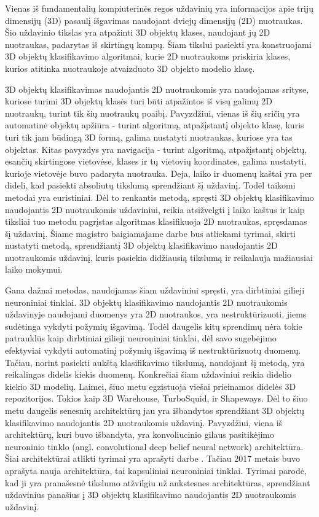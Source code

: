 
Vienas iš fundamentalių kompiuterinės regos uždavinių yra informacijos apie trijų dimensijų (3D) pasaulį išgavimas naudojant dviejų dimensijų (2D) nuotraukas. Šio uždavinio tikslas yra atpažinti 3D objektų klases, naudojant jų 2D nuotraukas, padarytas iš skirtingų kampų. Šiam tikslui pasiekti yra konstruojami 3D objektų klasifikavimo algoritmai, kurie 2D nuotraukoms priskiria klases, kurios atitinka nuotraukoje atvaizduoto 3D objekto modelio klasę.

3D objektų klasifikavimas naudojantis 2D nuotraukomis yra naudojamas srityse, kuriose turimi 3D objektų klasės turi būti atpažintos iš visų galimų 2D nuotraukų, turint tik šių nuotraukų poaibį. Pavyzdžiui, vienas iš šių sričių yra automatinė objektų apžiūra - turint algoritmą, atpažįstantį objekto klasę, kuris turi tik jam būdingą 3D formą, galima nustatyti nuotraukas, kuriose yra tas objektas. Kitas pavyzdys yra navigacija - turint algoritmą, atpažįstantį objektų, esančių skirtingose vietovėse, klases ir tų vietovių koordinates, galima nustatyti, kurioje vietovėje buvo padaryta nuotrauka. Deja, laiko ir duomenų kaštai yra per dideli, kad pasiekti absoliutų tikslumą sprendžiant šį uždavinį. Todėl taikomi metodai yra euristiniai. Dėl to renkantis metodą, spręsti 3D objektų klasifikavimo naudojantis 2D nuotraukomis uždaviniui, reikia atsižvelgti į laiko kaštus ir kaip tiksliai tuo metodu pagrįstas algoritmas klasifikuoja 2D nuotraukas, spręsdamas šį uždavinį. Šiame magistro baigiamajame darbe bus atliekami tyrimai, skirti nustatyti metodą, sprendžiantį 3D objektų klasifikavimo naudojantis 2D nuotraukomis uždavinį, kuris pasiekia didžiausią tikslumą ir reikalauja mažiausiai laiko mokymui.

Gana dažnai metodas, naudojamas šiam uždaviniui spręsti, yra dirbtiniai gilieji neuroniniai tinklai. 3D objektų klasifikavimo naudojantis 2D nuotraukomis uždavinyje naudojami duomenys yra 2D nuotraukos, yra nestruktūrizuoti, jiems sudėtinga vykdyti požymių išgavimą. Todėl daugelis kitų sprendimų nėra tokie patrauklūs kaip dirbtiniai gilieji neuroniniai tinklai, dėl savo sugebėjimo efektyviai vykdyti automatinį požymių išgavimą iš nestruktūrizuotų duomenų. Tačiau, norint pasiekti aukštą klasifikavimo tikslumą, naudojant šį metodą, yra reikalingas didelis kiekis duomenų. Konkrečiai šiam uždaviniui reikia didelio kiekio 3D modelių. Laimei, šiuo metu egzistuoja viešai prieinamos didelės 3D repozitorijos. Tokios kaip 3D Warehouse, TurboSquid, ir Shapeways. Dėl to šiuo metu daugelis senesnių architektūrų jau yra išbandytos sprendžiant 3D objektų klasifikavimo naudojantis 2D nuotraukomis uždavinį. Pavyzdžiui, viena iš architektūrų, kuri buvo išbandyta, yra konvoliucinio gilaus pasitikėjimo neuroninio tinklo (angl. convolutional deep belief neural network) architektūra. Šiai architektūrai atlikti tyrimai yra aprašyti darbe \cite{dbnExp}. Tačiau 2017 metais buvo aprašyta nauja architektūra, tai kapsuliniai neuroniniai tinklai. Tyrimai parodė, kad ji yra pranašesnė tikslumo atžvilgiu už ankstesnes architektūras, sprendžiant uždavinius panašius į 3D objektų klasifikavimo naudojantis 2D nuotraukomis uždavinį.

